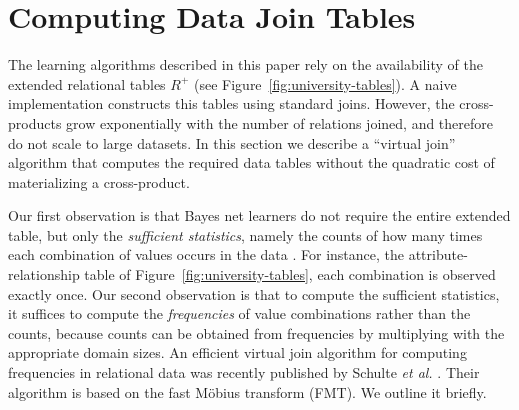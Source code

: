 \documentclass{article}
\begin{document}
%
%



\section{Computing Data Join Tables} \label{sec:mobius}

The learning algorithms described in this paper rely on the  availability of the extended relational tables $R^{+}$ (see Figure~\ref{fig:university-tables}). A naive implementation constructs this tables using standard joins. However, the cross-products grow exponentially with the number of relations joined, and therefore do not scale to large datasets. In this section we describe a ``virtual join'' algorithm that computes the required data tables without the quadratic cost of materializing a cross-product. 

Our first observation is that Bayes net learners do not require the entire extended table, but  only the {\em sufficient statistics}, namely the counts of how many times each combination of values occurs in the data \cite{Neapolitan2004}. For instance, the attribute-relationship table of Figure~\ref{fig:university-tables}, each combination is observed exactly once. Our second observation is that to compute the sufficient statistics, it suffices to compute the {\em frequencies} of value combinations rather than the counts, because counts can be obtained from frequencies by multiplying with the appropriate domain sizes. An efficient virtual join algorithm for computing frequencies in relational data was recently published by Schulte {\em et al.} \cite{Schulte2013}. Their algorithm is based on the fast M\"obius transform (FMT). We outline it briefly. 
\end{document}
